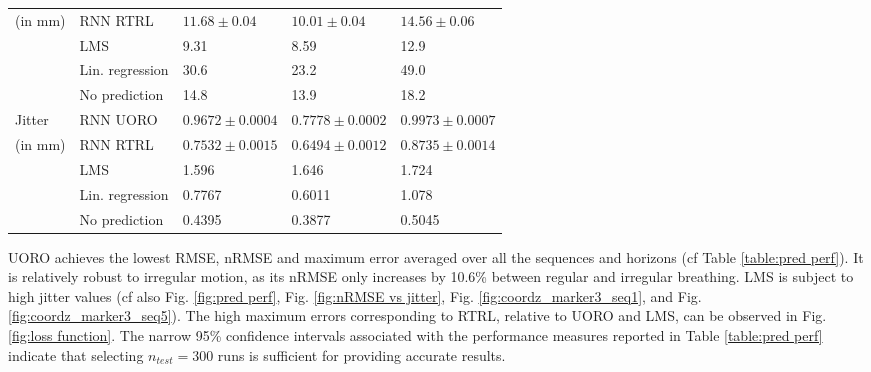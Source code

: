 \documentclass[twocolumn,a4paper]{svjour3} \sloppy          \smartqed
\begin{document}
\begin{table*}[tb!]
\begin{center}
\begin{tabular}{lllll}
(in mm)   & RNN RTRL        & $11.68 \pm 0.04$ & $10.01 \pm 0.04$ & $14.56 \pm 0.06$ \\
          & LMS             & 9.31 & 8.59 & 12.9 \\
          & Lin. regression & 30.6 & 23.2 & 49.0 \\
          & No prediction   & 14.8 & 13.9 & 18.2 \\   
\hline
Jitter    & RNN UORO        & $0.9672 \pm 0.0004$ & $0.7778 \pm 0.0002$ & $0.9973 \pm 0.0007$ \\
(in mm)   & RNN RTRL        & $0.7532 \pm 0.0015$ & $0.6494 \pm 0.0012$ & $0.8735 \pm 0.0014$ \\
          & LMS             & 1.596 & 1.646 & 1.724 \\
          & Lin. regression & 0.7767 & 0.6011 & 1.078 \\
          & No prediction   & 0.4395 & 0.3877 & 0.5045 \\                            
\hline
\end{tabular}
\end{center}
\caption{Comparison of the forecasting performance of each algorithm. Each error value corresponds to the average of a given performance measure of the test set over the sequences considered and the horizon values between 0.1s and 2.0s. The 95\% mean confidence intervals associated with the RNNs are calculated assuming that the error distribution is Gaussian (Eq. \ref{eq:conf interval mu}).}
\label{table:pred perf}
\end{table*}


UORO achieves the lowest RMSE, nRMSE and maximum error averaged over all the sequences and horizons (cf Table \ref{table:pred perf}). It is relatively robust to irregular motion, as its nRMSE only increases by 10.6\% between regular and irregular breathing. LMS is subject to high jitter values (cf also Fig. \ref{fig:pred perf}, Fig. \ref{fig:nRMSE vs jitter}, Fig. \ref{fig:coordz_marker3_seq1}, and Fig. \ref{fig:coordz_marker3_seq5}). The high maximum errors corresponding to RTRL, relative to UORO and LMS, can be observed in Fig. \ref{fig:loss function}. The narrow 95\% confidence intervals associated with the performance measures reported in Table \ref{table:pred perf} indicate that selecting $n_{test} = 300$ runs is sufficient for providing accurate results.
\end{document}
